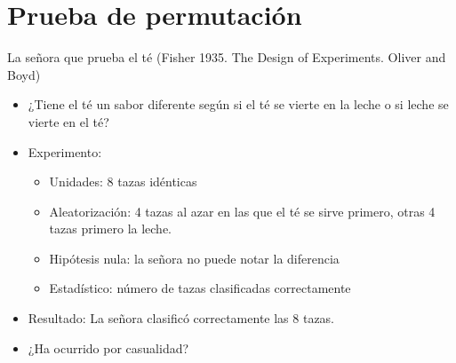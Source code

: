 \documentclass[
  ignorenonframetext,
]{beamer}
\providecommand{\tightlist}{%
  \setlength{\itemsep}{0pt}\setlength{\parskip}{0pt}}
\begin{document}
\hypertarget{prueba-de-permutaciuxf3n}{%
\section{Prueba de permutación}\label{prueba-de-permutaciuxf3n}}

\begin{frame}{La señora que prueba el té \small (Fisher 1935. The Design
of Experiments. Oliver and Boyd)}
\protect\hypertarget{la-seuxf1ora-que-prueba-el-tuxe9-fisher-1935.-the-design-of-experiments.-oliver-and-boyd}{}
\begin{itemize}
\item
  ¿Tiene el té un sabor diferente según si el té se vierte en la leche o
  si leche se vierte en el té? \pause
\item
  Experimento:

  \begin{itemize}
  \tightlist
  \item
    Unidades: 8 tazas idénticas
  \item
    Aleatorización: 4 tazas al azar en las que el té se sirve primero,
    otras 4 tazas primero la leche.
  \item
    Hipótesis nula: la señora no puede notar la diferencia
  \item
    Estadístico: número de tazas clasificadas correctamente \pause
  \end{itemize}
\item
  Resultado: La señora clasificó correctamente las 8 tazas. \pause
\item
  ¿Ha ocurrido por casualidad?
\end{itemize}
\end{frame}
\end{document}
